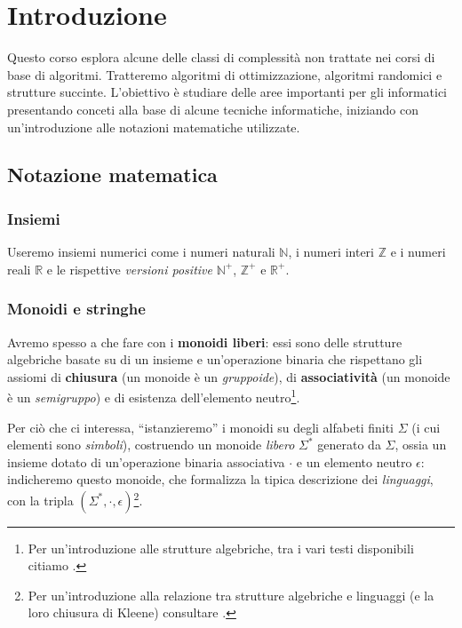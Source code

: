 
\chapter{Introduzione}
Questo corso esplora alcune delle classi di complessità non trattate nei corsi
di base di algoritmi. Tratteremo algoritmi di ottimizzazione, algoritmi
randomici e strutture succinte. L'obiettivo è studiare delle aree importanti per
gli informatici presentando conceti alla base di alcune tecniche informatiche,
iniziando con un'introduzione alle notazioni matematiche utilizzate.

\section{Notazione matematica}
\subsection{Insiemi}
Useremo insiemi numerici come i numeri naturali $\mathbb{N}$,
i numeri interi $\mathbb{Z}$ e i numeri reali $\mathbb{R}$ e le rispettive
{\it versioni positive} $\mathbb{N}^+$,  $\mathbb{Z}^+$ e $\mathbb{R}^+$.

\subsection{Monoidi e stringhe}
Avremo spesso a che fare con i {\bf monoidi liberi}: essi sono delle strutture
algebriche basate su di un insieme e un'operazione binaria che rispettano gli
assiomi di {\bf chiusura} (un monoide è un \textit{gruppoide}), di {\bf
associatività} (un monoide è un \textit{semigruppo}) e di esistenza
dell'elemento neutro\footnote{Per un'introduzione alle strutture algebriche, tra
i vari testi disponibili citiamo \cite{maclane_1999}.}.

Per ciò che ci interessa, ``istanzieremo'' i monoidi su degli alfabeti finiti
$\Sigma$ (i cui elementi sono {\it simboli}), costruendo un monoide
\textit{libero} $\Sigma^*$ generato da $\Sigma$, ossia un insieme dotato di
un'operazione binaria associativa $\cdot$ e un elemento neutro $\epsilon$:
indicheremo questo monoide, che formalizza la tipica descrizione dei
\textit{linguaggi}, con la tripla $(\Sigma^*, \cdot, \epsilon)$\footnote{ Per
  un'introduzione alla relazione tra strutture algebriche e linguaggi (e la loro
chiusura di Kleene) consultare \cite{sakarovitch_2009}.}.

